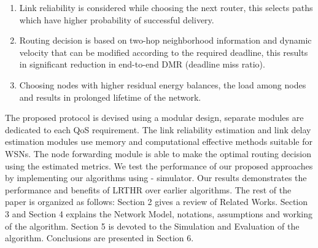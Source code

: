 \documentclass[fleqn,twoside]{article}
\begin{document}
\begin{enumerate}
\item
Link reliability is considered while choosing the next router, this selects paths which have higher probability of successful delivery.
\item
Routing decision is based on two-hop neighborhood information and dynamic velocity that can be modified according to the required deadline, this results in significant reduction in end-to-end DMR (deadline miss ratio).
\item
Choosing nodes with higher residual energy balances, the load among nodes and results in prolonged lifetime of the network.
\end{enumerate}
The proposed protocol is devised using a modular design, separate modules are dedicated to each QoS requirement. The
link reliability estimation and link delay estimation modules use memory and computational effective methods
suitable for WSNs. The node forwarding module is able to make the optimal routing decision using the estimated metrics. We test the performance of our proposed approaches by implementing our algorithms using - simulator. Our results
demonstrates the performance and benefits of LRTHR over earlier algorithms.
\vskip 2mm
The rest of the paper is organized as follows: Section 2 gives a review of Related Works. Section 3 and Section 4 explains the Network Model, notations, assumptions and working of the algorithm. Section 5 is devoted to the Simulation and Evaluation of the algorithm. Conclusions are presented in Section 6.
\end{document}
